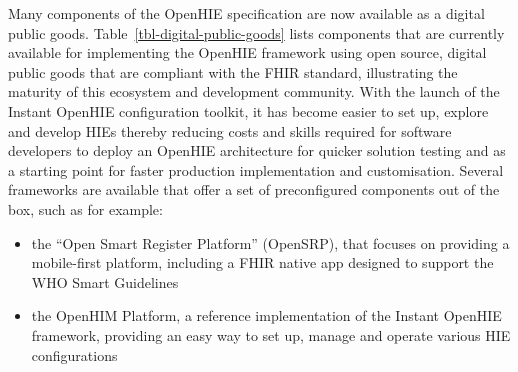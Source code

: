 \documentclass[
  authoryear]{elsarticle}
\providecommand{\tightlist}{%
  \setlength{\itemsep}{0pt}\setlength{\parskip}{0pt}}\usepackage{longtable,booktabs,array}
\begin{document}
Many components of the OpenHIE specification are now available as a
digital public goods. Table~\ref{tbl-digital-public-goods} lists
components that are currently available for implementing the OpenHIE
framework using open source, digital public goods that are compliant
with the FHIR standard, illustrating the maturity of this ecosystem and
development community. With the launch of the Instant OpenHIE
configuration toolkit\citep{InstantOpenHIEv2}, it has become easier to
set up, explore and develop HIEs thereby reducing costs and skills
required for software developers to deploy an OpenHIE architecture for
quicker solution testing and as a starting point for faster production
implementation and customisation. Several frameworks are available that
offer a set of preconfigured components out of the box, such as for
example:

\begin{itemize}
\tightlist
\item
  the ``Open Smart Register Platform'' (OpenSRP), that focuses on
  providing a mobile-first platform, including a FHIR native app
  designed to support the WHO Smart Guidelines
\item
  the OpenHIM Platform, a reference implementation of the Instant
  OpenHIE framework, providing an easy way to set up, manage and operate
  various HIE configurations
\end{itemize}
\end{document}
